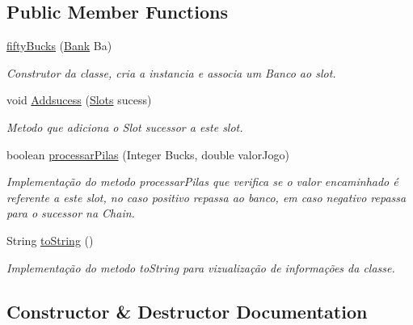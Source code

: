 \subsection*{Public Member Functions}
\begin{DoxyCompactItemize}
\item 
\mbox{\hyperlink{classchain_of_responsability_pattern_1_1fifty_bucks_a4d3043c4cf3b43f732520252bf21bf06}{fifty\+Bucks}} (\mbox{\hyperlink{classmediator_pattern_1_1_bank}{Bank}} Ba)
\begin{DoxyCompactList}\small\item\em Construtor da classe, cria a instancia e associa um Banco ao slot. \end{DoxyCompactList}\item 
void \mbox{\hyperlink{classchain_of_responsability_pattern_1_1fifty_bucks_a5ea94a00d828803aa2c256ba4d2c9ffb}{Addsucess}} (\mbox{\hyperlink{interfacechain_of_responsability_pattern_1_1_slots}{Slots}} sucess)
\begin{DoxyCompactList}\small\item\em Metodo que adiciona o Slot sucessor a este slot. \end{DoxyCompactList}\item 
boolean \mbox{\hyperlink{classchain_of_responsability_pattern_1_1fifty_bucks_a4c121b5ed57a0de7ea0e1669d4b60b5c}{processar\+Pilas}} (Integer Bucks, double valor\+Jogo)
\begin{DoxyCompactList}\small\item\em Implementação do metodo processar\+Pilas que verifica se o valor encaminhado é referente a este slot, no caso positivo repassa ao banco, em caso negativo repassa para o sucessor na Chain. \end{DoxyCompactList}\item 
String \mbox{\hyperlink{classchain_of_responsability_pattern_1_1fifty_bucks_a374ee3efc8a2989bb48178190c6321f3}{to\+String}} ()
\begin{DoxyCompactList}\small\item\em Implementação do metodo to\+String para vizualização de informações da classe. \end{DoxyCompactList}\end{DoxyCompactItemize}


\subsection{Constructor \& Destructor Documentation}
\mbox{\label{classchain_of_responsability_pattern_1_1fifty_bucks_a4d3043c4cf3b43f732520252bf21bf06}} 
